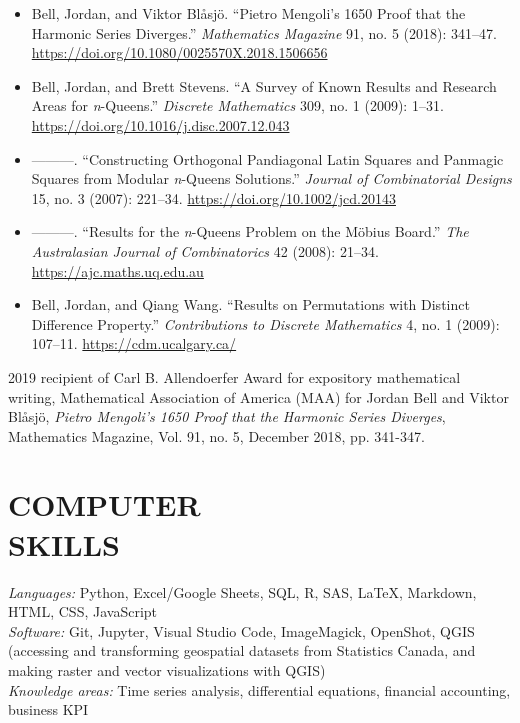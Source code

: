 \documentclass[margin, 10pt]{res} %
\begin{document}
\begin{resume}
\begin{itemize}
\item Bell, Jordan, and Viktor Blåsjö. “Pietro Mengoli’s 1650 Proof that the Harmonic Series Diverges.” {\em Mathematics Magazine} 91, no. 5 (2018): 341–47. \url{https://doi.org/10.1080/0025570X.2018.1506656}

\item Bell, Jordan, and Brett Stevens. “A Survey of Known Results and Research Areas for {\em n}-Queens.” {\em Discrete Mathematics} 309, no. 1 (2009): 1–31. \url{https://doi.org/10.1016/j.disc.2007.12.043}

\item ———. “Constructing Orthogonal Pandiagonal Latin Squares and Panmagic Squares from Modular {\em n}-Queens Solutions.” {\em Journal of Combinatorial Designs} 15, no. 3 (2007): 221–34. \url{https://doi.org/10.1002/jcd.20143}

\item ———. “Results for the {\em n}-Queens Problem on the Möbius Board.” {\em The Australasian Journal of Combinatorics} 42 (2008): 21–34. \url{https://ajc.maths.uq.edu.au}

\item Bell, Jordan, and Qiang Wang. “Results on Permutations with Distinct Difference Property.” {\em Contributions to Discrete Mathematics} 4, no. 1 (2009): 107–11. \url{https://cdm.ucalgary.ca/}
\end{itemize}


2019 recipient of Carl B. Allendoerfer Award for expository mathematical writing, Mathematical Association of America (MAA) for Jordan Bell and Viktor Blåsjö, {\em Pietro Mengoli’s 1650 Proof that the Harmonic Series Diverges}, Mathematics Magazine, Vol. 91, no. 5, December 2018, pp. 341-347.


\section{COMPUTER \\ SKILLS} 

{\sl Languages:} 
Python, Excel/Google Sheets, SQL, R, SAS, \LaTeX{}, Markdown, HTML, CSS, JavaScript \\

{\sl Software:}
Git, Jupyter, Visual Studio Code, ImageMagick, OpenShot, QGIS (accessing and transforming geospatial datasets from Statistics Canada, and making raster and vector visualizations with QGIS)\\

{\sl Knowledge areas:}
Time series analysis, differential equations, financial accounting, business KPI

\end{resume}
\end{document}
